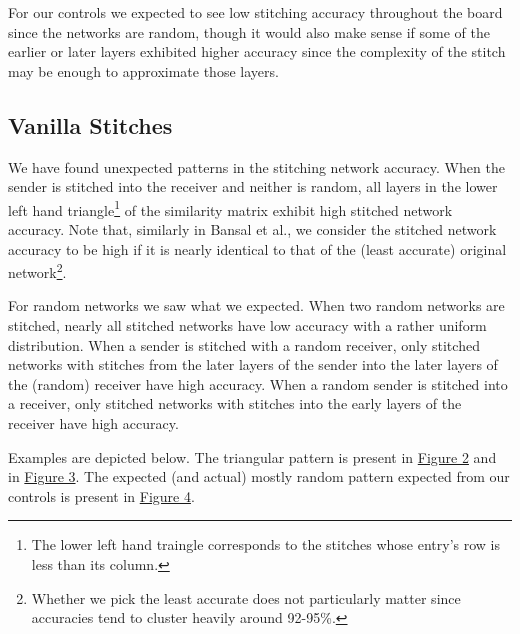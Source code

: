 \documentclass{article} %
\begin{document}
For our controls we expected to see low stitching accuracy throughout the board since the networks are random, though
it would also make sense if some of the earlier or later layers exhibited higher accuracy since the complexity of the stitch
may be enough to approximate those layers.

\subsection*{Vanilla Stitches}
We have found unexpected patterns in the stitching network accuracy.
When the sender is stitched into
the receiver and neither is random, all layers in the lower left hand triangle\footnote{
   The lower left hand traingle corresponds to the stitches whose entry's row is less than its column.
}
of the similarity matrix exhibit high stitched network accuracy. Note that, similarly in Bansal et al.,
we consider the stitched network accuracy to be high if it is nearly identical to that of the
(least accurate) original network\footnote{
   Whether we pick the least accurate does not particularly matter since accuracies tend to cluster heavily around 92-95\%.
}.

For random networks we saw what we expected.
When two random networks are stitched, nearly all stitched networks have low
accuracy with a rather uniform distribution. When
a sender is stitched with a random receiver, only stitched networks with stitches from the
later layers of the sender into the later layers of the (random)
receiver have high accuracy. When a random sender is stitched
into a receiver, only stitched networks with stitches into the early layers of the
receiver have high accuracy.

Examples are depicted below. The triangular pattern is present in \hyperref[Figure2]{Figure 2} and in \hyperref[Figure3]{Figure 3}.
The expected (and actual) mostly random pattern expected from our controls is present in \hyperref[Figure4]{Figure 4}.
\end{document}

